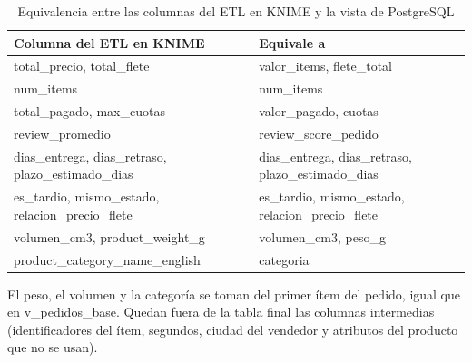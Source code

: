 \documentclass[a4paper,stu,12pt,donotrepeattitle,floatsintext]{apa7}
\begin{document}
{\footnotesize
\begin{longtable}{|>{\raggedright\arraybackslash}p{}|>{\raggedright\arraybackslash}p{}|}
\caption{Equivalencia entre las columnas del ETL en KNIME y la vista de PostgreSQL}\\
\hline
\textbf{Columna del ETL en KNIME} & \textbf{Equivale a} \\ \hline
\endhead
total\_\allowbreak{}precio, total\_\allowbreak{}flete & valor\_\allowbreak{}items, flete\_\allowbreak{}total \\ \hline
num\_\allowbreak{}items & num\_\allowbreak{}items \\ \hline
total\_\allowbreak{}pagado, max\_\allowbreak{}cuotas & valor\_\allowbreak{}pagado, cuotas \\ \hline
review\_\allowbreak{}promedio & review\_\allowbreak{}score\_\allowbreak{}pedido \\ \hline
dias\_\allowbreak{}entrega, dias\_\allowbreak{}retraso, plazo\_\allowbreak{}estimado\_\allowbreak{}dias & dias\_\allowbreak{}entrega, dias\_\allowbreak{}retraso, plazo\_\allowbreak{}estimado\_\allowbreak{}dias \\ \hline
es\_\allowbreak{}tardio, mismo\_\allowbreak{}estado, relacion\_\allowbreak{}precio\_\allowbreak{}flete & es\_\allowbreak{}tardio, mismo\_\allowbreak{}estado, relacion\_\allowbreak{}precio\_\allowbreak{}flete \\ \hline
volumen\_\allowbreak{}cm3, product\_\allowbreak{}weight\_\allowbreak{}g & volumen\_\allowbreak{}cm3, peso\_\allowbreak{}g \\ \hline
product\_\allowbreak{}category\_\allowbreak{}name\_\allowbreak{}english & categoria \\ \hline
\end{longtable}
}
El peso, el volumen y la categoría se toman del primer ítem del pedido, igual que en v\_\allowbreak{}pedidos\_\allowbreak{}base. Quedan fuera de la tabla final las columnas intermedias (identificadores del ítem, segundos, ciudad del vendedor y atributos del producto que no se usan).
\end{document}
